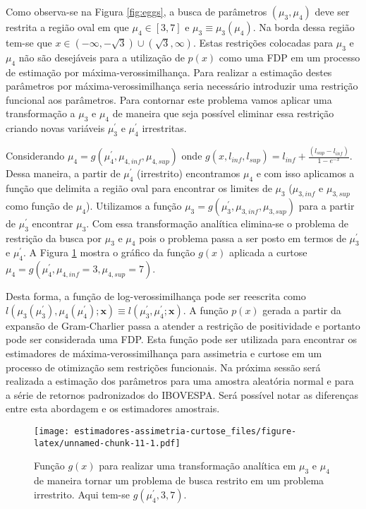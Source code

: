 \documentclass[]{article}
\begin{document}
Como observa-se na Figura \ref{fig:eggs}, a busca de parâmetros
\((\mu_3, \mu_4)\) deve ser restrita a região oval em que
\(\mu_4 \in [3,7]\) e \(\mu_3 \equiv \mu_3(\mu_4)\). Na borda dessa
região tem-se que
\(x \in (-\infty, -\sqrt{3}) \cup (\sqrt{3}, \infty)\). Estas restrições
colocadas para \(\mu_3\) e \(\mu_4\) não são desejáveis para a
utilização de \(p(x)\) como uma FDP em um processo de estimação por
máxima-verossimilhança. Para realizar a estimação destes parâmetros por
máxima-verossimilhança seria necessário introduzir uma restrição
funcional aos parâmetros. Para contornar este problema vamos aplicar uma
transformação a \(\mu_3\) e \(\mu_4\) de maneira que seja possível
eliminar essa restrição criando novas variáveis \(\mu_3^\prime\) e
\(\mu_4^\prime\) irrestritas.

Considerando \(\mu_4 = g(\mu_4^\prime, \mu_{4,inf}, \mu_{4,sup})\) onde
\(g(x, l_{inf}, l_{sup}) = l_{inf} + \frac{(l_{sup} - l_{inf})}{1 - e^{-x}}\).
Dessa maneira, a partir de \(\mu_4^\prime\) (irrestrito) encontramos
\(\mu_4\) e com isso aplicamos a função que delimita a região oval para
encontrar os limites de \(\mu_3\) (\(\mu_{3,inf}\) e \(\mu_{3,sup}\)
como função de \(\mu_4\)). Utilizamos a função
\(\mu_3 = g(\mu_3^\prime, \mu_{3,inf}, \mu_{3,sup})\) para a partir de
\(\mu_3^\prime\) encontrar \(\mu_3\). Com essa transformação analítica
elimina-se o problema de restrição da busca por \(\mu_3\) e \(\mu_4\)
pois o problema passa a ser posto em termos de \(\mu_3^\prime\) e
\(\mu_4^\prime\). A Figura \ref{fig:limit-transform} mostra o gráfico da
função \(g(x)\) aplicada a curtose
\(\mu_4 = g(\mu_4^\prime, \mu_{4,inf}=3, \mu_{4,sup}=7)\).

Desta forma, a função de log-verossimilhança pode ser reescrita como
\(l(\mu_3(\mu_3^\prime), \mu_4(\mu_4^\prime); \mathbf{x}) \equiv l(\mu_3^\prime, \mu_4^\prime; \mathbf{x})\).
A função \(p(x)\) gerada a partir da expansão de Gram-Charlier passa a
atender a restrição de positividade e portanto pode ser considerada uma
FDP. Esta função pode ser utilizada para encontrar os estimadores de
máxima-verossimilhança para assimetria e curtose em um processo de
otimização sem restrições funcionais. Na próxima sessão será realizada a
estimação dos parâmetros para uma amostra aleatória normal e para a
série de retornos padronizados do IBOVESPA. Será possível notar as
diferenças entre esta abordagem e os estimadores amostrais.

\begin{figure}
\centering
\texttt{[image: estimadores-assimetria-curtose\_files/figure-latex/unnamed-chunk-11-1.pdf]}
\caption{\label{fig:limit-transform} Função \(g(x)\) para realizar uma
transformação analítica em \(\mu_3\) e \(\mu_4\) de maneira tornar um
problema de busca restrito em um problema irrestrito. Aqui tem-se
\(g(\mu_4^\prime, 3, 7)\).}
\end{figure}
\end{document}
